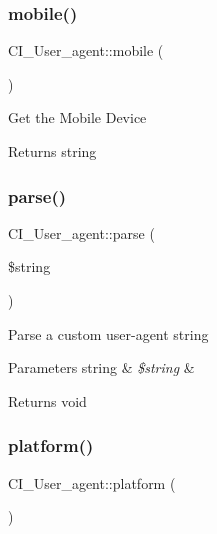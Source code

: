 \subsubsection{\texorpdfstring{mobile()}{mobile()}}
{\footnotesize\ttfamily C\+I\+\_\+\+User\+\_\+agent\+::mobile (\begin{DoxyParamCaption}{ }\end{DoxyParamCaption})}

Get the Mobile Device

\begin{DoxyReturn}{Returns}
string 
\end{DoxyReturn}
\mbox{\label{class_c_i___user__agent_af91e04c44f0aa65869a9f9013d854c03}} 
\subsubsection{\texorpdfstring{parse()}{parse()}}
{\footnotesize\ttfamily C\+I\+\_\+\+User\+\_\+agent\+::parse (\begin{DoxyParamCaption}\item[{}]{\$string }\end{DoxyParamCaption})}

Parse a custom user-\/agent string


\begin{DoxyParams}[1]{Parameters}
string & {\em \$string} & \\
\hline
\end{DoxyParams}
\begin{DoxyReturn}{Returns}
void 
\end{DoxyReturn}
\mbox{\label{class_c_i___user__agent_ab169095ba39467d0c16f92f0dfe5b68e}} 
\subsubsection{\texorpdfstring{platform()}{platform()}}
{\footnotesize\ttfamily C\+I\+\_\+\+User\+\_\+agent\+::platform (\begin{DoxyParamCaption}{ }\end{DoxyParamCaption})}


